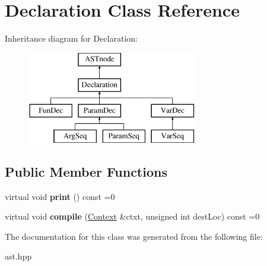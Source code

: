 \hypertarget{class_declaration}{}\section{Declaration Class Reference}
\label{class_declaration}
Inheritance diagram for Declaration\+:\begin{figure}[H]
\begin{center}
\leavevmode
\includegraphics[height=4.000000cm]{class_declaration}
\end{center}
\end{figure}
\subsection*{Public Member Functions}
\begin{DoxyCompactItemize}
\item 
\mbox{\label{class_declaration_a40b12f4c11d0111a207ba46be46468e0}} 
virtual void {\bfseries print} () const =0
\item 
\mbox{\label{class_declaration_ab5851fc955e24903f06849c0c1ec74d3}} 
virtual void {\bfseries compile} (\hyperlink{class_context}{Context} \&ctxt, unsigned int dest\+Loc) const =0
\end{DoxyCompactItemize}


The documentation for this class was generated from the following file\+:\begin{DoxyCompactItemize}
\item 
ast.\+hpp\end{DoxyCompactItemize}
